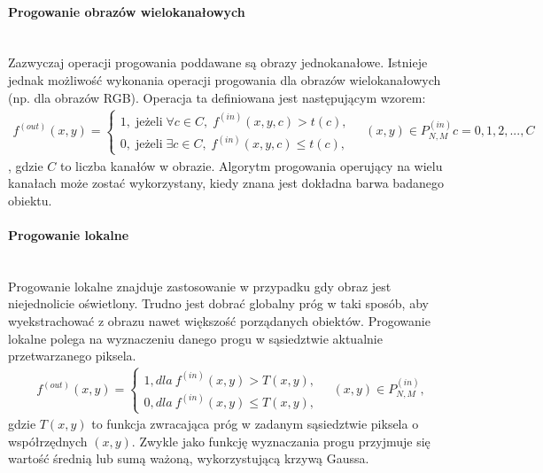 \paragraph{Progowanie obrazów wielokanałowych}\mbox{}\\
Zazwyczaj operacji progowania poddawane są obrazy jednokanałowe. Istnieje jednak możliwość wykonania operacji progowania dla obrazów wielokanałowych (np. dla obrazów RGB). Operacja ta definiowana jest następującym wzorem:
\begin{gather*}
  f^{(out)}(x, y) = \left\{\begin{matrix}
  1, \; \text{jeżeli} \; \forall c \in C, \; f^{(in)}(x, y, c) > t(c),\\
  0, \; \text{jeżeli} \; \exists c \in C, \; f^{(in)}(x, y, c) \leq t(c),
  \end{matrix}\right. \quad (x, y) \in P^{(in)}_{N,M} c=0,1,2,...,C
\end{gather*},
gdzie $C$ to liczba kanałów w obrazie.
Algorytm progowania operujący na wielu kanałach może zostać wykorzystany, kiedy znana jest dokładna barwa badanego obiektu.

\paragraph{Progowanie lokalne}\mbox{}\\
Progowanie lokalne znajduje zastosowanie w przypadku gdy obraz jest niejednolicie oświetlony. Trudno jest dobrać globalny próg w taki sposób, aby wyekstrachować z obrazu nawet większość porządanych obiektów. Progowanie lokalne polega na wyznaczeniu danego progu w sąsiedztwie aktualnie przetwarzanego piksela. 
\begin{gather*}
  f^{(out)}(x, y) = \left\{\begin{matrix}
  1, dla \: f^{(in)}(x, y) > T(x, y),\\
  0, dla \: f^{(in)}(x, y) \leq T(x, y),
  \end{matrix}\right. \quad (x, y) \in P^{(in)}_{N,M},
\end{gather*}
gdzie $T(x, y)$ to funkcja zwracająca próg w zadanym sąsiedztwie piksela o współrzędnych $(x, y)$. Zwykle jako funkcję wyznaczania progu przyjmuje się wartość średnią lub sumą ważoną, wykorzystującą krzywą Gaussa.

